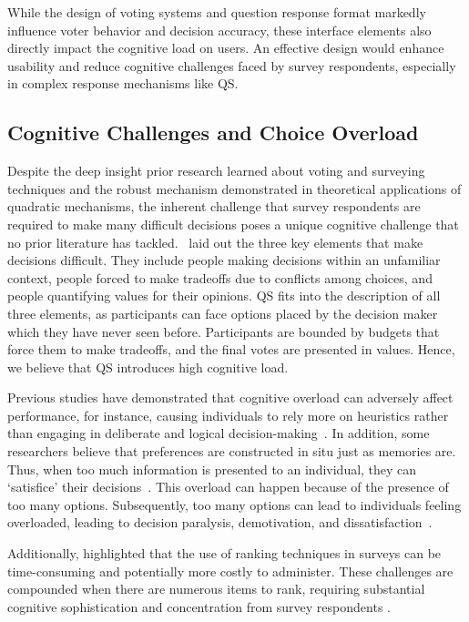 While the design of voting systems and question response format markedly influence voter behavior and decision accuracy, these interface elements also directly impact the cognitive load on users. An effective design would enhance usability and reduce cognitive challenges faced by survey respondents, especially in complex response mechanisms like QS.

\subsection{Cognitive Challenges and Choice Overload}
Despite the deep insight prior research learned about voting and surveying techniques and the robust mechanism demonstrated in theoretical applications of quadratic mechanisms, the inherent challenge that survey respondents are required to make many difficult decisions poses a unique cognitive challenge that no prior literature has tackled.~\textcite{lichtensteinConstructionPreference2006} laid out the three key elements that make decisions difficult. They include people making decisions within an unfamiliar context, people forced to make tradeoffs due to conflicts among choices, and people quantifying values for their opinions. QS fits into the description of all three elements, as participants can face options placed by the decision maker which they have never seen before. Participants are bounded by budgets that force them to make tradeoffs, and the final votes are presented in values. Hence, we believe that QS introduces high cognitive load.

Previous studies have demonstrated that cognitive overload can adversely affect performance, for instance, causing individuals to rely more on heuristics rather than engaging in deliberate and logical decision-making~\cite{daniel2017thinking}. In addition, some researchers believe that preferences are constructed in situ just as memories are. Thus, when too much information is presented to an individual, they can `satisfice' their decisions~\cite{simonBehavioralModelRational1955, payneAdaptiveStrategySelection1988, tverskyJudgmentsRepresentativeness}. This overload can happen because of the presence of too many options. Subsequently, too many options can lead to individuals feeling overloaded, leading to decision paralysis, demotivation, and dissatisfaction~\cite{iyengarWhenChoiceDemotivating2000}. 

Additionally, \textcite{alwinMeasurementValuesSurveys1985} highlighted that the use of ranking techniques in surveys can be time-consuming and potentially more costly to administer. These challenges are compounded when there are numerous items to rank, requiring substantial cognitive sophistication and concentration from survey respondents \cite{featherMeasurementValuesEffects1973}.

